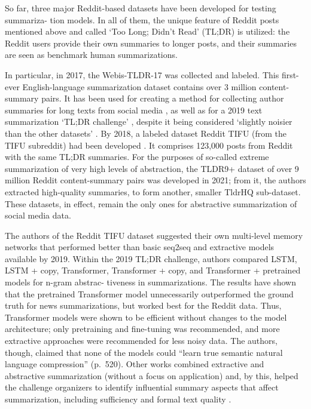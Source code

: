 So far, three major Reddit-based datasets have been developed for testing summariza- tion models. In all of them, the unique feature of Reddit posts mentioned above and called ‘Too Long; Didn’t Read’ (TL;DR) is utilized: the Reddit users provide their own summaries to longer posts, and their summaries are seen as benchmark human summarizations.

In particular, in 2017, the Webis-TLDR-17 was collected and labeled. This first-ever English-language summarization dataset contains over 3 million content-summary pairs. It has been used for creating a method for collecting author summaries for long texts from social media \cite{VolskePotthastSyed}, as well as for a 2019 text summarization ‘TL;DR challenge’ \cite{SyedYousefAlKhatib}, despite it being considered ‘slightly noisier than the other datasets’ \cite{BommasaniCardie}. By 2018, a labeled dataset Reddit TIFU (from the TIFU subreddit) had been developed \cite{KimKimKim}. It comprises 123,000 posts from Reddit with the same TL;DR summaries. For the purposes of so-called extreme summarization of very high levels of abstraction, the TLDR9+ dataset of over 9 million Reddit content-summary pairs was developed in 2021; from it, the authors \cite{SotudehDeilamsalehyDernoncourt} extracted high-quality summaries, to form another, smaller TldrHQ sub-dataset. These datasets, in effect, remain the only ones for abstractive summarization of social media data.

The authors of the Reddit TIFU dataset suggested their own multi-level memory networks \cite{KimKimKim} that performed better than basic seq2seq and extractive models available by 2019. Within the 2019 TL;DR challenge, authors \cite{GehrmannZieglerRush} compared LSTM, LSTM + copy, Transformer, Transformer + copy, and Transformer + pretrained models for n-gram abstrac- tiveness in summarizations. The results have shown that the pretrained Transformer model unnecessarily outperformed the ground truth for news summarizations, but worked best for the Reddit data. Thus, Transformer models were shown to be efficient without changes to the model architecture; only pretraining and fine-tuning was recommended, and more extractive approaches were recommended for less noisy data. The authors, though, claimed that none of the models could “learn true semantic natural language compression” (p.~520). Other works \cite{ChoiRavuruDryjanski} combined extractive and abstractive summarization (without a focus on application) and, by this, helped the challenge organizers to identify influential summary aspects that affect summarization, including sufficiency and formal text quality \cite{SyedYousefAlKhatib}.

